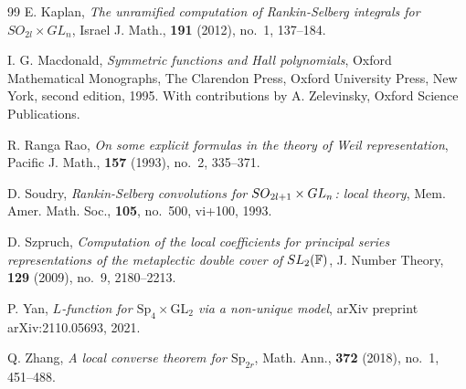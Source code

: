 \documentclass[11pt]{amsart}
\theoremstyle{definition}
\theoremstyle{remark}
\begin{document}
\begin{thebibliography}{99}
E. Kaplan, 
\textit{The unramified computation of {R}ankin-{S}elberg integrals for {$SO_{2l}\times GL_n$}}, Israel J. Math., \textbf{191} (2012), no.~1, 137--184.


I. G. Macdonald, \textit{Symmetric functions and {H}all polynomials},  Oxford Mathematical Monographs, The Clarendon Press, Oxford University Press, New York, second edition, 1995. With contributions by A. Zelevinsky,
              Oxford Science Publications.

R. Ranga Rao, \textit{On some explicit formulas in the theory of {W}eil representation},  Pacific J. Math., \textbf{157} (1993), no.~2, 335--371. 


D. Soudry, \textit{Rankin-{S}elberg convolutions for {${\rm SO}_{2l+1}\times{\rm
              GL}_n$}: local theory},  Mem. Amer. Math. Soc., \textbf{105}, no.~500, vi+100, 1993. 

D. Szpruch, \textit{Computation of the local coefficients for principal series
              representations of the metaplectic double cover of {${\rm
              SL}_2(\mathbb{F})$}},  J. Number Theory, \textbf{129} (2009), no.~9, 2180--2213. 

P. Yan, \textit{$L$-function for $\mathrm{Sp}_4\times\mathrm{GL}_2$ via a non-unique model}, arXiv preprint arXiv:2110.05693, 2021.


Q. Zhang, \textit{A local converse theorem for ${\mathrm {Sp}}_{2r}$},  Math. Ann., \textbf{372} (2018), no.~1, 451--488. 


\end{thebibliography} 
\end{document}
